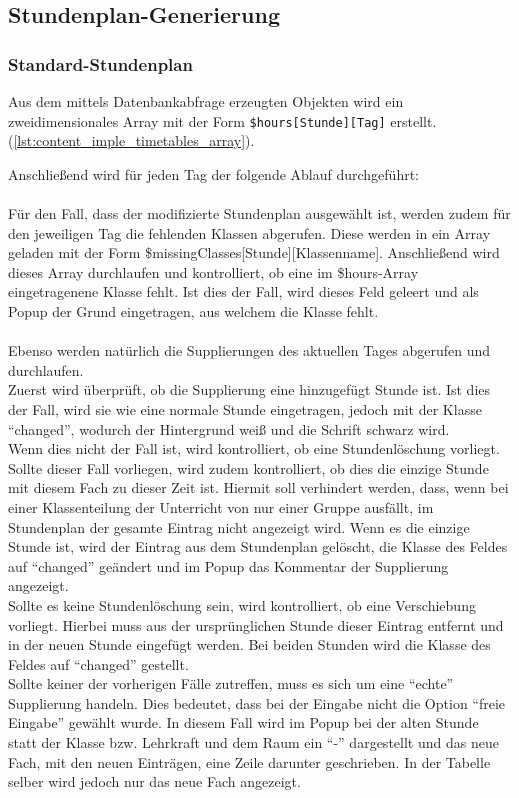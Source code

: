 \subsection{Stundenplan-Generierung}
\subsubsection{Standard-Stundenplan}
Aus dem mittels Datenbankabfrage erzeugten Objekten wird ein zweidimensionales Array mit der Form \texttt{\$hours[Stunde][Tag]} erstellt. (\autoref{lst:content_imple_timetables_array}).


Anschließend wird für jeden Tag der folgende Ablauf durchgeführt:\\\\
Für den Fall, dass der modifizierte Stundenplan ausgewählt ist, werden zudem für den jeweiligen Tag die fehlenden Klassen abgerufen. Diese werden in ein Array geladen mit der Form \$missingClasses[Stunde][Klassenname]. Anschließend wird dieses Array durchlaufen und kontrolliert, ob eine im \$hours-Array eingetragenene Klasse fehlt. Ist dies der Fall, wird dieses Feld geleert und als Popup der Grund eingetragen, aus welchem die Klasse fehlt. \\\\
Ebenso werden natürlich die Supplierungen des aktuellen Tages abgerufen und durchlaufen. \\
Zuerst wird überprüft, ob die Supplierung eine hinzugefügt Stunde ist. Ist dies der Fall, wird sie wie eine normale Stunde eingetragen, jedoch mit der Klasse \enquote{changed}, wodurch der Hintergrund weiß und die Schrift schwarz wird.\\
Wenn dies nicht der Fall ist, wird kontrolliert, ob eine Stundenlöschung vorliegt. Sollte dieser Fall vorliegen, wird zudem kontrolliert, ob dies die einzige Stunde mit diesem Fach zu dieser Zeit ist. Hiermit soll verhindert werden, dass, wenn bei einer Klassenteilung der Unterricht von nur einer Gruppe ausfällt, im Stundenplan der gesamte Eintrag nicht angezeigt wird. Wenn es die einzige Stunde ist, wird der Eintrag aus dem Stundenplan gelöscht, die Klasse des Feldes auf \enquote{changed} geändert und im Popup das Kommentar der Supplierung angezeigt.\\
Sollte es keine Stundenlöschung sein, wird kontrolliert, ob eine Verschiebung vorliegt. Hierbei muss aus der ursprünglichen Stunde dieser Eintrag entfernt und in der neuen Stunde eingefügt werden. Bei beiden Stunden wird die Klasse des Feldes auf \enquote{changed} gestellt.\\
Sollte keiner der vorherigen Fälle zutreffen, muss es sich um eine \enquote{echte} Supplierung handeln. Dies bedeutet, dass bei der Eingabe nicht die Option \enquote{freie Eingabe} gewählt wurde. In diesem Fall wird im Popup bei der alten Stunde statt der Klasse bzw. Lehrkraft und dem Raum ein \enquote{-} dargestellt und das neue Fach, mit den neuen Einträgen, eine Zeile darunter geschrieben. In der Tabelle selber wird jedoch nur das neue Fach angezeigt.

